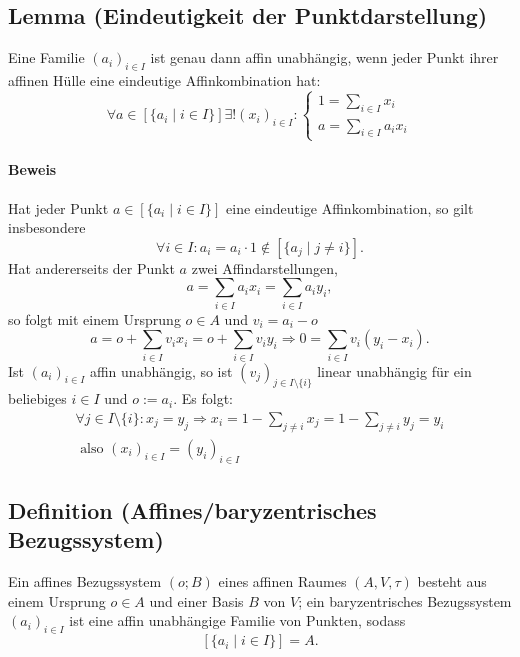 \subsection{Lemma (Eindeutigkeit der Punktdarstellung)}
	\begin{Lemma}
		Eine Familie $ (a_i)_{i\in I} $ ist genau dann affin unabhängig, wenn jeder Punkt ihrer affinen Hülle eine eindeutige Affinkombination hat:
		\[ \forall a\in [\{a_i\mid i\in I\}]\exists!(x_i)_{i\in I}:
			\begin{cases}
			1 = \sum_{i\in I}x_i\\
			a = \sum_{i\in I}a_ix_i
			\end{cases}\]
	\end{Lemma}
	
\paragraph{Beweis}
	Hat jeder Punkt $ a\in [\{a_i\mid i\in I\}] $ eine eindeutige Affinkombination, so gilt insbesondere
		\[ \forall i\in I: a_i = a_i\cdot 1 \notin [\{a_j\mid j\neq i\}]. \]
	Hat andererseits der Punkt $ a $ zwei Affindarstellungen,
		\[ a = \sum_{i\in I} a_ix_i = \sum_{i\in I}a_iy_i, \]
	so folgt mit einem Ursprung $ o\in A $ und $ v_i = a_i-o $
		\[ a=o+\sum_{i\in I}v_ix_i=o+\sum_{i\in I}v_iy_i \Rightarrow 0 = \sum_{i\in I}v_i(y_i-x_i). \]
	Ist $ (a_i)_{i\in I} $ affin unabhängig, so ist $ (v_j)_{j\in I\setminus \{i\}} $ linear unabhängig für ein beliebiges $ i\in I $ und $ o:= a_i $. Es folgt:
	\begin{gather*}
        \forall j\in I\setminus \{i\}:x_j=y_j \Rightarrow x_i = 1-\sum_{j\neq i}x_j = 1-\sum_{j\neq i}y_j = y_i 
        \\ \text{ also } (x_{i})_{i \in I} = (y_{i})_{i \in I}
	\end{gather*}

\subsection{Definition (Affines/baryzentrisches Bezugssystem)}
	\begin{Definition}
	Ein affines Bezugssystem $ (o;B) $ eines affinen Raumes $ (A,V,\tau) $ besteht aus einem Ursprung $ o\in A $ und einer Basis $ B $ von $ V $;
	ein baryzentrisches Bezugssystem $ (a_i)_{i\in I} $ ist eine affin unabhängige Familie von Punkten, sodass 
		\[ [\{a_i\mid {i\in I}\}] = A. \]
	\end{Definition}
	
